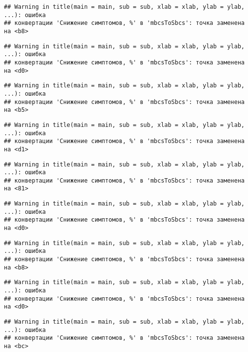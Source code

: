 \documentclass[
]{article}
\begin{document}
\begin{verbatim}
## Warning in title(main = main, sub = sub, xlab = xlab, ylab = ylab, ...): ошибка
## конвертации 'Снижение симптомов, %' в 'mbcsToSbcs': точка заменена на <b8>
\end{verbatim}

\begin{verbatim}
## Warning in title(main = main, sub = sub, xlab = xlab, ylab = ylab, ...): ошибка
## конвертации 'Снижение симптомов, %' в 'mbcsToSbcs': точка заменена на <d0>
\end{verbatim}

\begin{verbatim}
## Warning in title(main = main, sub = sub, xlab = xlab, ylab = ylab, ...): ошибка
## конвертации 'Снижение симптомов, %' в 'mbcsToSbcs': точка заменена на <b5>
\end{verbatim}

\begin{verbatim}
## Warning in title(main = main, sub = sub, xlab = xlab, ylab = ylab, ...): ошибка
## конвертации 'Снижение симптомов, %' в 'mbcsToSbcs': точка заменена на <d1>
\end{verbatim}

\begin{verbatim}
## Warning in title(main = main, sub = sub, xlab = xlab, ylab = ylab, ...): ошибка
## конвертации 'Снижение симптомов, %' в 'mbcsToSbcs': точка заменена на <81>
\end{verbatim}

\begin{verbatim}
## Warning in title(main = main, sub = sub, xlab = xlab, ylab = ylab, ...): ошибка
## конвертации 'Снижение симптомов, %' в 'mbcsToSbcs': точка заменена на <d0>
\end{verbatim}

\begin{verbatim}
## Warning in title(main = main, sub = sub, xlab = xlab, ylab = ylab, ...): ошибка
## конвертации 'Снижение симптомов, %' в 'mbcsToSbcs': точка заменена на <b8>
\end{verbatim}

\begin{verbatim}
## Warning in title(main = main, sub = sub, xlab = xlab, ylab = ylab, ...): ошибка
## конвертации 'Снижение симптомов, %' в 'mbcsToSbcs': точка заменена на <d0>
\end{verbatim}

\begin{verbatim}
## Warning in title(main = main, sub = sub, xlab = xlab, ylab = ylab, ...): ошибка
## конвертации 'Снижение симптомов, %' в 'mbcsToSbcs': точка заменена на <bc>
\end{verbatim}
\end{document}
